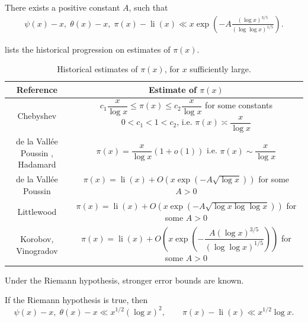 \begin{theorem}
There exists a positive constant $A$, such that
\begin{align*}
\psi(x) - x, \; \theta(x) - x, \; \pi(x) - \operatorname{li}(x) \ll x\exp\left(-A\frac{(\log x)^{3/5}}{(\log\log x)^{1/5}}\right).
\end{align*}
\end{theorem}

 lists the historical progression on estimates of $\pi(x)$.

\begin{table}[ht]
    \caption{Historical estimates of $\pi(x)$, for $x$ sufficiently large.}
    \label{prime-error-table}
    \centering
    \renewcommand{\arraystretch}{2.2}
    \begin{tabular}{|c|c|}
    \hline
    Reference & Estimate of $\pi(x)$\\
    \hline
    Chebyshev & $c_1 \dfrac{x}{\log x} \leq \pi(x) \leq c_2 \dfrac{x}{\log x}$ for some constants $0 < c_1 < 1 < c_2$, i.e. $\pi(x) \asymp \dfrac{x}{\log x}$\\
    \hline
    de la Vall\'{e}e Poussin \cite{de_la_vallee_poussin_recherches_1896}, Hadamard \cite{hadamard_distribution_1896} & $\pi(x) = \dfrac{x}{\log x}(1 + o(1))$ i.e. $\pi(x) \sim \dfrac{x}{\log x}$\\
    \hline
    de la Vall\'{e}e Poussin \cite{de_la_vallee_poussin_fonction_1899} & $\pi(x) = \operatorname{li}(x) + O(x\exp(-A\sqrt{\log x}))$ for some $A > 0$\\
    \hline
    Littlewood \cite{littlewood_researches_1922} & $\pi(x) = \operatorname{li}(x) + O(x\exp(-A\sqrt{\log x\log\log x}))$ for some $A > 0$\\
    \hline
    Korobov, Vinogradov \cite{vinogradov_eine_1958} & $\pi(x) = \operatorname{li}(x) + O\left(x\exp\left(-\dfrac{A(\log x)^{3/5}}{(\log\log x)^{1/5}}\right)\right)$ for some $A > 0$\\
    \hline
    \end{tabular}
\end{table}

Under the Riemann hypothesis, stronger error bounds are known.
\begin{theorem}
If the Riemann hypothesis is true, then
\[
\psi(x) - x,\; \theta(x) - x \ll x^{1/2}(\log x)^2,\qquad \pi(x) - \operatorname{li}(x) \ll x^{1/2}\log x.
\]
\end{theorem}

